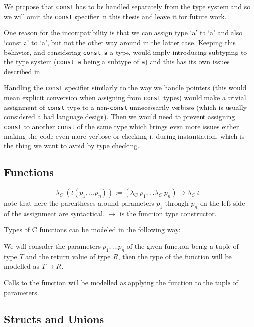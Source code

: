 We propose that \lstinline{const} has to be handled separately from the type system and so we will omit the \lstinline{const} specifier in this thesis and leave it for future work.

One reason for the incompatibility is that we can assign type `a' to `a' and also `const a' to `a', but not the other way around in the latter case. Keeping this behavior, and considering \lstinline{const a} a type, would imply introducing subtyping to the type system (\lstinline{const a} being a subtype of \lstinline{a}) and this has its own issues described in %

Handling the \lstinline{const} specifier similarly to the way we handle pointers (this would mean explicit conversion when assigning from \lstinline{const} types) would make a trivial assignment of \lstinline{const} type to a non-\lstinline{const} unnecessarily verbose (which is usually considered a bad language design). Then we would need to prevent assigning \lstinline{const} to another \lstinline{const} of the same type which brings even more issues either making the code even more verbose or checking it during instantiation, which is the thing we want to avoid by type checking.

\subsection{Functions}

\begin{defn}
	$$\lambda_C\ (t(p_1, \dots p_n)) := (\lambda_C\ p_1, \dots \lambda_C\ p_n) \rightarrow \lambda_C\ t$$
	note that here the parentheses around parameters $p_1$ through $p_n$ on the left side of the assignment are syntactical. $\rightarrow$ is the function type constructor.
\end{defn}

Types of C functions can be modeled in the following way:

We will consider the parameters $p_1, \dots p_n$ of the given function being a tuple of type $T$ and the return value of type $R$, then the type of the function will be modelled as $T \rightarrow R$.

Calls to the function will be modelled as applying the function to the tuple of parameters.

\subsection{Structs and Unions}

